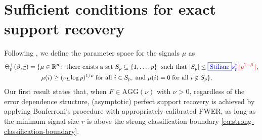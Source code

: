 


\section{Sufficient conditions for exact support recovery}
\label{subsec:sufficient}

Following \citet*{butucea2018variable}, we define the parameter space for the signals $\mu$ as
\begin{align} \label{eq:minimax-signal-config-over}
    \Theta_p^+(\beta, \underline{r}) &= \{\mu\in\mathbb{R}^p:\;\text{there exists a set }S_p\subseteq\{1,\ldots,p\}\;\text{ such that }|S_p|\le {\color{blue}\fbox{Stilian:} s_p^\dagger }{\color{red}\lfloor p^{1-\beta}\rfloor}, \nonumber \\
    &\quad\quad\mu(i)\ge (\nu\underline{r}\log{p})^{1/\nu}\;\text{for all }i\in S_p,\;\text{and }\mu(i)=0\;\text{for all }i\not\in S_p\},
\end{align}
Our first result states that, when $F\in \text{AGG}(\nu)$ with $\nu>0$, regardless of the error dependence structure, (asymptotic) perfect support recovery is achieved by applying Bonferroni's procedure with appropriately calibrated FWER, as long as the minimum signal size $\underline{r}$ is above the strong classification boundary \eqref{eq:strong-classification-boundary}.

